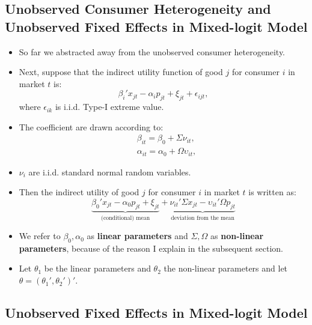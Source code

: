 \documentclass[
]{book}
\providecommand{\tightlist}{%
  \setlength{\itemsep}{0pt}\setlength{\parskip}{0pt}}
\begin{document}
\hypertarget{unobserved-consumer-heterogeneity-and-unobserved-fixed-effects-in-mixed-logit-model}{%
\subsection{Unobserved Consumer Heterogeneity and Unobserved Fixed Effects in Mixed-logit Model}\label{unobserved-consumer-heterogeneity-and-unobserved-fixed-effects-in-mixed-logit-model}}

\begin{itemize}
\tightlist
\item
  So far we abstracted away from the unobserved consumer heterogeneity.
\item
  Next, suppose that the indirect utility function of good \(j\) for consumer \(i\) in market \(t\) is:
  \begin{equation}
  \beta_i' x_{jt}  - \alpha_i p_{jt} + \xi_{jt} + \epsilon_{ijt},
  \end{equation}
  where \(\epsilon_{ik}\) is i.i.d. Type-I extreme value.
\item
  The coefficient are drawn according to:
  \begin{equation}
  \begin{split}
  &\beta_{it} = \beta_0 + \Sigma \nu_{it},\\
  &\alpha_{it} = \alpha_0 + \Omega \upsilon_{it},
  \end{split}
  \end{equation}
\item
  \(\nu_i\) are i.i.d. standard normal random variables.
\item
  Then the indirect utility of good \(j\) for consumer \(i\) in market \(t\) is written as:
  \begin{equation}
  \underbrace{\beta_0' x_{jt} - \alpha_0 p_{jt} + \xi_{jt}}_{\text{(conditional) mean}} + \underbrace{\nu_{it}' \Sigma x_{jt} - \upsilon_{it}' \Omega p_{jt}}_{\text{deviation from the mean}} 
  \end{equation}
\item
  We refer to \(\beta_0, \alpha_0\) as \textbf{linear parameters} and \(\Sigma, \Omega\) as \textbf{non-linear parameters}, because of the reason I explain in the subsequent section.
\item
  Let \(\theta_1\) be the linear parameters and \(\theta_2\) the non-linear parameters and let \(\theta = (\theta_1', \theta_2')'\).
\end{itemize}

\hypertarget{unobserved-fixed-effects-in-mixed-logit-model}{%
\subsection{Unobserved Fixed Effects in Mixed-logit Model}\label{unobserved-fixed-effects-in-mixed-logit-model}}
\end{document}
